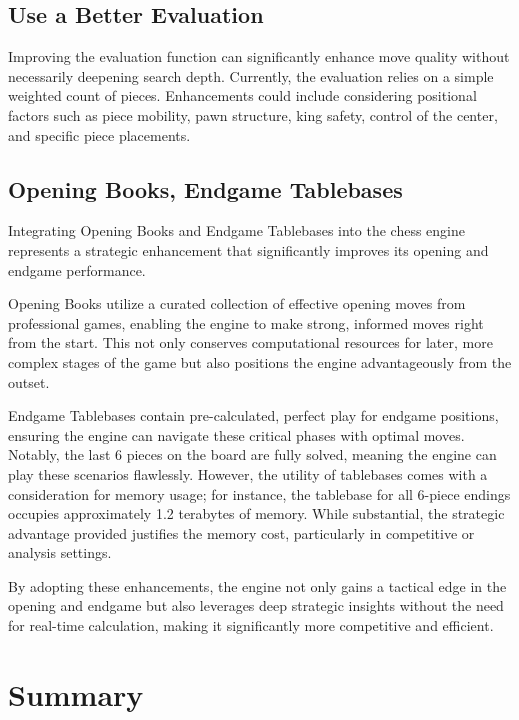 \documentclass{article}
\begin{document}
\subsection{Use a Better Evaluation}
Improving the evaluation function can significantly enhance move quality without necessarily deepening search depth. Currently, the evaluation relies on a simple weighted count of pieces. Enhancements could include considering positional factors such as piece mobility, pawn structure, king safety, control of the center, and specific piece placements.



\subsection{Opening Books, Endgame Tablebases}

Integrating Opening Books and Endgame Tablebases into the chess engine represents a strategic enhancement that significantly improves its opening and endgame performance.

Opening Books utilize a curated collection of effective opening moves from professional games, enabling the engine to make strong, informed moves right from the start. This not only conserves computational resources for later, more complex stages of the game but also positions the engine advantageously from the outset.

Endgame Tablebases contain pre-calculated, perfect play for endgame positions, ensuring the engine can navigate these critical phases with optimal moves. Notably, the last 6 pieces on the board are fully solved, meaning the engine can play these scenarios flawlessly. However, the utility of tablebases comes with a consideration for memory usage; for instance, the tablebase for all 6-piece endings occupies approximately 1.2 terabytes of memory. While substantial, the strategic advantage provided justifies the memory cost, particularly in competitive or analysis settings.

By adopting these enhancements, the engine not only gains a tactical edge in the opening and endgame but also leverages deep strategic insights without the need for real-time calculation, making it significantly more competitive and efficient.



\section{Summary}
\end{document}
